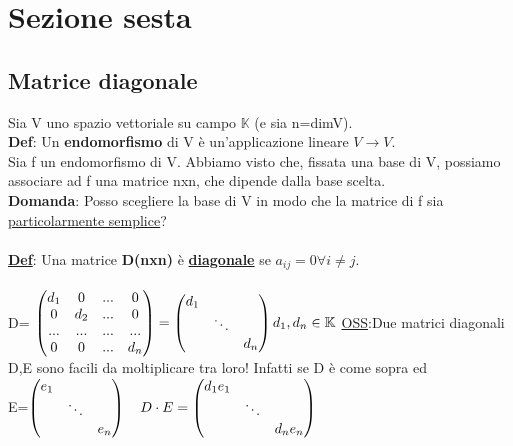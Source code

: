 \documentclass[12pt]{article}
\begin{document}
\section{Sezione sesta}
\subsection{Matrice diagonale}
Sia V uno spazio vettoriale su campo $\mathbb{K}$ (e sia n=dimV).\\
\textbf{Def}: Un \textbf{endomorfismo} di V è un'applicazione lineare $V \longrightarrow V$.\\
Sia f un endomorfismo di V. Abbiamo visto che, fissata una base di V, possiamo associare ad f una matrice nxn, che dipende dalla base scelta.\\
\textbf{Domanda}: Posso scegliere la base di V in modo che la matrice di f sia \underline{particolarmente semplice}?\\\\
\underline{\textbf{Def}}: Una matrice \textbf{D(nxn)} è \textbf{\underline{diagonale}} se $a_{ij} = 0 \forall i \neq j$.\\\\
D=
$\begin{pmatrix}
  d_1 & 0 & ... & 0\\
  0 & d_2 & ... & 0\\
  ... & ... & ... & ...\\
  0 & 0 & ... & d_n
\end{pmatrix}
= \begin{pmatrix}
    d_1 & & \\
    & \ddots &  \\
    & & d_n 
\end{pmatrix}
d_1, d_n \in \mathbb{K}\\\\
$
\underline{OSS}:Due matrici diagonali D,E sono facili da moltiplicare tra loro! Infatti se D è come sopra ed\\
E=$\begin{pmatrix}
    e_1 & & \\
    & \ddots & \\
    & & e_n
\end{pmatrix}
\quad D\cdot E = \begin{pmatrix}
    d_1e_1 & & \\
    & \ddots & \\
    & & d_ne_n
\end{pmatrix}\\
$
\end{document}
